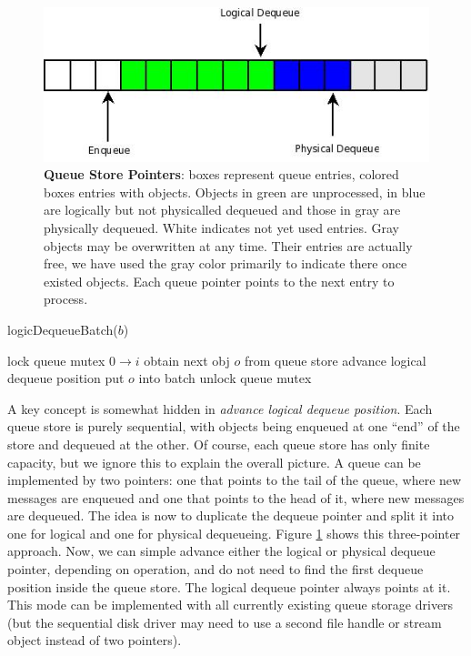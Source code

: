 \documentclass[a4paper,10pt]{article}
\begin{document}
\begin{figure}[h]
\begin{center}
\includegraphics[scale=0.6]{rsyslog_queue_pointers.jpeg}
\end{center}
\caption{\textbf{Queue Store Pointers}: boxes represent queue entries, colored boxes entries with objects. Objects in green are unprocessed, in blue are logically but not physicalled dequeued and those in gray are physically dequeued. White indicates not yet used entries. Gray objects may be overwritten at any time. Their entries are actually free, we have used the gray color primarily to indicate there once existed objects. Each queue pointer points to the next entry to process.}
\label{fig_queue_ptr}
\end{figure}

\begin{algorithm}
\caption{logicDequeueBatch($b$)}
\begin{algorithmic}
\label{alg_ldeq_batch_1}
\STATE lock queue mutex
\STATE $0 \to i$
	\STATE obtain next obj $o$ from queue store 
	\STATE advance logical dequeue position
	\STATE put $o$ into batch
\ENDWHILE
\STATE unlock queue mutex
\end{algorithmic}
\end{algorithm}

A key concept is somewhat hidden in  \emph{advance logical dequeue position}. Each queue store is purely sequential, with objects being enqueued at one ``end'' of the store and dequeued at the other. Of course, each queue store has only finite capacity, but we ignore this to explain the overall picture. A queue can be implemented by two pointers: one that points to the tail of the queue, where new messages are enqueued and one that points to the head of it, where new messages are dequeued. The idea is now to duplicate the dequeue pointer and split it into one for logical and one for physical dequeueing. Figure \ref{fig_queue_ptr} shows this three-pointer approach. Now, we can simple advance either the logical or physical dequeue pointer, depending on operation, and do not need to find the first dequeue position inside the queue store. The logical dequeue pointer always points at it. This mode can be implemented with all currently existing queue storage drivers (but the sequential disk driver may need to use a second file handle or stream object instead of two pointers).
\end{document}
